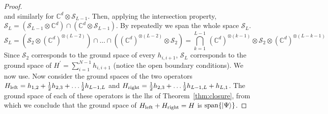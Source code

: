 \documentclass[a4paper,10pt,twoside]{article}
\DeclareMathOperator{\spanset}{span}
\theoremstyle{modern}
\begin{document}
\begin{section}{}
\begin{proof}
\[\]
and similarly for $\mathbb{C}^d \otimes \mathcal{S}_{L-1}$.
Then, applying the intersection property, $\mathcal{S}_L = \left(\mathcal{S}_{L-1} \otimes \mathbb{C}^d\right) \cap \left(\mathbb{C}^d \otimes \mathcal{S}_{L-1}\right)$.
By repeatedly  we span the whole space $\mathcal{S}_L$.
\[
  \mathcal{S}_L = 
  \left(\mathcal{S}_2 \otimes (\mathbb{C}^d)^{\otimes(L-2)}\right) \cap  \dots \cap \left((\mathbb{C}^d)^{\otimes(L-2)} \otimes \mathcal{S}_2 \right) = 
  \bigcap_{k=1}^{L-1} \, (\mathbb{C}^d)^{\otimes(k-1)} \otimes \mathcal{S}_2 \otimes (\mathbb{C}^d)^{\otimes(L-k-1)}
\]
Since $\mathcal{S}_2$ corresponds to the ground space of every $h_{i,i+1}$, $\mathcal{S}_L$ corresponds to the ground space of $H^\prime = \sum_{i=1}^{N-1} h_{i,i+1}$ (notice the open boundary conditions).
We now use. 
Now consider the ground spaces of the two operators $H_{\rm left} = h_{1,2} + \frac{1}{2} h_{2,3} + \dots  \frac{1}{2} h_{L-1,L}$
and $H_{\rm right} = \frac{1}{2} h_{2,3} + \dots  \frac{1}{2} h_{L-1,L} + h_{L,1}$.
The ground space of each of these operators is the lhs of Theorem~\ref{thm:closure}, from which we conclude that the ground space of $H_{\rm left} + H_{\rm right} = H$ is $\spanset\{\ket{\Psi}\}$.
\end{proof}
\end{section}
\end{document}
